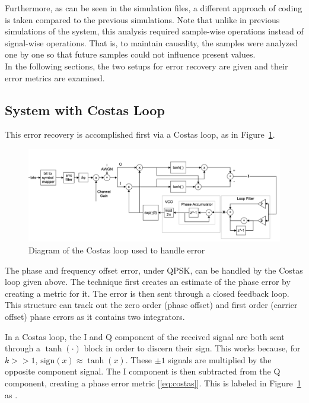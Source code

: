 \documentclass[]{article}
\newcommand{\rom}[1]{\uppercase\expandafter{\romannumeral#1}}
\begin{document}
Furthermore, as  can be seen in the simulation files, a different approach of coding is taken compared to the previous simulations. Note that unlike in previous simulations of the system, this analysis required sample-wise operations instead of signal-wise operations. That is, to maintain causality, the samples were analyzed one by one so that future samples could not influence present values.\\

In the following sections, the two setups for error recovery are given and their error metrics are examined.


\newpage

\subsection{System with Costas Loop}
This error recovery is accomplished first via a Costas loop, as in Figure~\ref{fig:costas}. 

\begin{figure}[H]
\centering
\includegraphics[width=\textwidth]{costas.png}
\caption{Diagram of the Costas loop used to handle error\label{fig:costas}}
\end{figure}

The phase and frequency offset error, under QPSK, can be handled by the Costas loop given above. The technique first creates an estimate of the phase error by creating a metric for it.  The error is then sent through a closed feedback loop.  This structure can track out the zero order (phase offset) and first order (carrier offset) phase errors as it contains two integrators. 

In a Costas loop, the I and Q component of the received signal are both sent through a $\tanh\left(\cdot\right)$ block in order to discern their sign.  This works because, for $k>>1$, $\text{sign}\left(x\right) \approx \tanh \left(x\right)$.  These $\pm1$ signals are multiplied by the opposite component signal.  The I component is then subtracted from the Q component, creating a phase error metric [\ref{eq:costas}].  This is labeled in Figure~\ref{fig:costas} as \rom{1}. 
\end{document}
